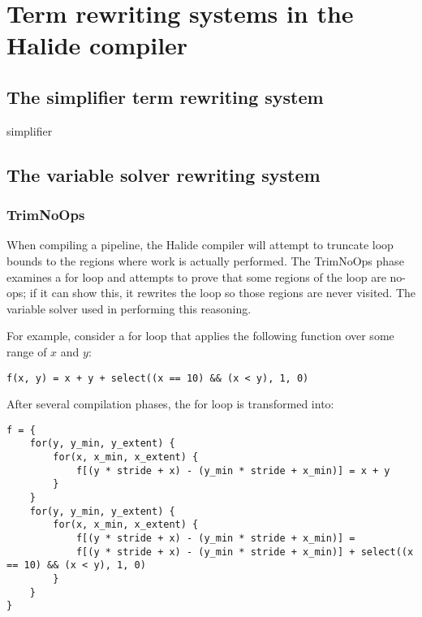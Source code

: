 \section{Term rewriting systems in the Halide compiler}

\subsection{The simplifier term rewriting system}

simplifier

\subsection{The variable solver rewriting system}

\subsubsection{TrimNoOps}

When compiling a pipeline, the Halide compiler will attempt to truncate loop bounds to the regions where work is actually performed. The TrimNoOps phase examines a for loop and attempts to prove that some regions of the loop are no-ops; if it can show this, it rewrites the loop so those regions are never visited. The variable solver used in performing this reasoning.

For example, consider a for loop that applies the following function over some range of $x$ and $y$:

\begin{verbatim}
f(x, y) = x + y + select((x == 10) && (x < y), 1, 0)
\end{verbatim}

After several compilation phases, the for loop is transformed into:

\begin{verbatim}
f = {
	for(y, y_min, y_extent) {
		for(x, x_min, x_extent) {
			f[(y * stride + x) - (y_min * stride + x_min)] = x + y
		}
	}
	for(y, y_min, y_extent) {
		for(x, x_min, x_extent) {
			f[(y * stride + x) - (y_min * stride + x_min)] = 
			f[(y * stride + x) - (y_min * stride + x_min)] + select((x == 10) && (x < y), 1, 0)
		}
	}
}
\end{verbatim}

